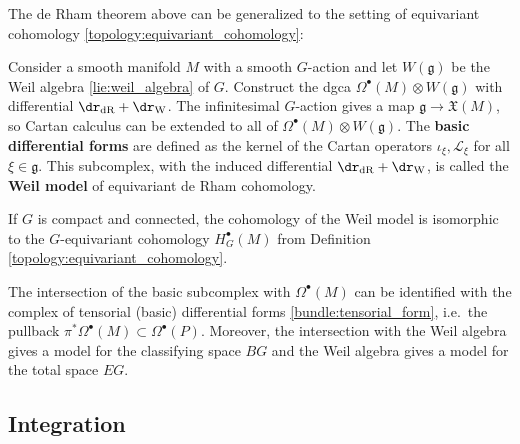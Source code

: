 
    The de Rham theorem above can be generalized to the setting of equivariant cohomology \ref{topology:equivariant_cohomology}:
    \begin{property}
        Consider a smooth manifold $M$ with a smooth $G$-action and let $W(\mathfrak{g})$ be the Weil algebra \ref{lie:weil_algebra} of $G$. Construct the dgca $\Omega^\bullet(M)\otimes W(\mathfrak{g})$ with differential $\dr_\text{dR}+\dr_\text{W}$. The infinitesimal $G$-action gives a map $\mathfrak{g}\rightarrow\mathfrak{X}(M)$, so Cartan calculus can be extended to all of $\Omega^\bullet(M)\otimes W(\mathfrak{g})$. The \textbf{basic differential forms} are defined as the kernel of the Cartan operators $\iota_\xi,\mathcal{L}_\xi$ for all $\xi\in\mathfrak{g}$. This subcomplex, with the induced differential $\dr_\mathrm{dR}+\dr_\text{W}$, is called the \textbf{Weil model} of equivariant de Rham cohomology.

        If $G$ is compact and connected, the cohomology of the Weil model is isomorphic to the $G$-equivariant cohomology $H_G^\bullet(M)$ from Definition \ref{topology:equivariant_cohomology}.
    \end{property}
    \begin{property}
        The intersection of the basic subcomplex with $\Omega^\bullet(M)$ can be identified with the complex of tensorial (basic) differential forms \ref{bundle:tensorial_form}, i.e.~the pullback $\pi^*\Omega^\bullet(M)\subset\Omega^\bullet(P)$. Moreover, the intersection with the Weil algebra gives a model for the classifying space $BG$ and the Weil algebra gives a model for the total space $EG$.
    \end{property}

\subsection{Integration}

